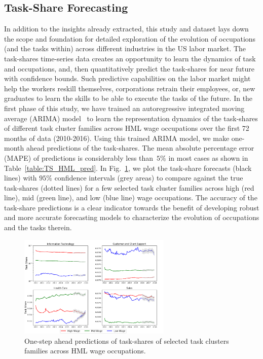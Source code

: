 \documentclass[letterpaper]{article} %
\begin{document}
\vspace{-1.89mm}
\subsection{Task-Share Forecasting}
\label{subsec:res_forecast}
In addition to the insights already extracted, this study and dataset lays down the scope and foundation for detailed exploration of the evolution of occupations (and the tasks within) across different industries in the US labor market. The task-shares time-series data creates an opportunity to learn the dynamics of task and occupations, and, then quantitatively predict the task-shares for near future with confidence bounds. Such predictive capabilities on the labor market might help the workers reskill themselves, corporations retrain their employees, or, new graduates to learn the skills to be able to execute the tasks of the future.  In the first phase of this study, we have trained an autoregressive integrated moving average (ARIMA) model~\cite{makridakis2008forecasting} to learn the representation dynamics of the task-shares of different task cluster families across HML wage occupations over the first 72 months of data (2010-2016). Using this trained ARIMA model, we make one-month ahead predictions of the task-shares. The mean absolute percentage error (MAPE) of predictions is considerably less than~$5\%$ in most cases as shown in Table~\ref{table:TS_HML_pred}. In Fig.~\ref{fig:pred}, we plot the task-share forecasts (black lines) with $95\%$ confidence intervals (grey areas) to compare against the true task-shares (dotted lines) for a few selected task cluster families across high (red line), mid (green line), and low (blue line) wage occupations. The accuracy of the task-share predictions is a clear indicator towards the benefit of developing robust and more accurate forecasting models to characterize the evolution of occupations and the tasks therein.
\begin{figure}[t!]
\includegraphics[width=0.864\linewidth,height=1.93in ]{combined_pred.png}
\caption{One-step ahead predictions of task-shares of selected task clusters families across HML wage occupations.}
\label{fig:pred}
\end{figure}
\end{document}
